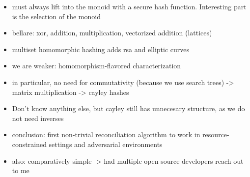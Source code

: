 \documentclass{beamer}
\begin{document}
\begin{itemize}
    \item must always lift into the monoid with a secure hash function. Interesting part is the selection of the monoid
    \item bellare: xor, addition, multiplication, vectorized addition (lattices)
    \item multiset homomorphic hashing adds rsa and elliptic curves
    \item we are weaker: homomorphism-flavored characterization
    \item in particular, no need for commutativity (because we use search trees) -> matrix multiplication -> cayley hashes
    \item Don't know anything else, but cayley still has unnecesary structure, as we do not need inverses
\end{itemize}

\begin{itemize}
    \item conclusion: first non-trivial reconciliation algorithm to work in resource-constrained settings and adversarial environments
    \item also: comparatively simple -> had multiple open source developers reach out to me
\end{itemize}
\end{document}
